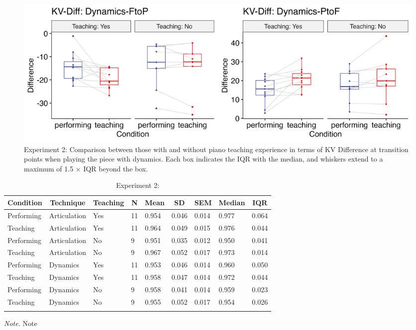 \documentclass[
  man,floatsintext]{apa6}
\begin{document}
\begin{figure}
\includegraphics[width=1\linewidth]{manuscript_files/figure-latex/plot-dyn-diff-teaching-2-1} \caption{\label{fig:dyn-diff-teaching-2}Experiment 2: Comparison between those with and without piano teaching experience in terms of KV Difference at transition points when playing the piece with dynamics. Each box indicates the IQR with the median, and whiskers extend to a maximum of 1.5 × IQR beyond the box.}\label{fig:plot-dyn-diff-teaching-2}
\end{figure}

\begin{table}[tbp]

\begin{center}
\begin{threeparttable}

\caption{\label{tab:ioi-teaching-desc-2}Experiment 2:}

\begin{tabular}{lllllllll}
\toprule
Condition & \multicolumn{1}{c}{Technique} & \multicolumn{1}{c}{Teaching} & \multicolumn{1}{c}{N} & \multicolumn{1}{c}{Mean} & \multicolumn{1}{c}{SD} & \multicolumn{1}{c}{SEM} & \multicolumn{1}{c}{Median} & \multicolumn{1}{c}{IQR}\\
\midrule
Performing & Articulation & Yes & 11 & 0.954 & 0.046 & 0.014 & 0.977 & 0.064\\
Teaching & Articulation & Yes & 11 & 0.964 & 0.049 & 0.015 & 0.976 & 0.044\\
Performing & Articulation & No & 9 & 0.951 & 0.035 & 0.012 & 0.950 & 0.041\\
Teaching & Articulation & No & 9 & 0.967 & 0.052 & 0.017 & 0.973 & 0.014\\
Performing & Dynamics & Yes & 11 & 0.953 & 0.046 & 0.014 & 0.960 & 0.050\\
Teaching & Dynamics & Yes & 11 & 0.958 & 0.047 & 0.014 & 0.972 & 0.044\\
Performing & Dynamics & No & 9 & 0.958 & 0.041 & 0.014 & 0.959 & 0.023\\
Teaching & Dynamics & No & 9 & 0.955 & 0.052 & 0.017 & 0.954 & 0.026\\
\bottomrule
\addlinespace
\end{tabular}

\begin{tablenotes}[para]
\normalsize{\textit{Note.} Note}
\end{tablenotes}

\end{threeparttable}
\end{center}

\end{table}
\end{document}
